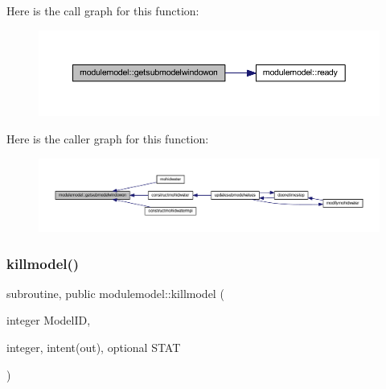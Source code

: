 Here is the call graph for this function\+:\nopagebreak
\begin{figure}[H]
\begin{center}
\leavevmode
\includegraphics[width=350pt]{namespacemodulemodel_a2bb34f8b006f66681bc7e7276eb4579e_cgraph}
\end{center}
\end{figure}
Here is the caller graph for this function\+:\nopagebreak
\begin{figure}[H]
\begin{center}
\leavevmode
\includegraphics[width=350pt]{namespacemodulemodel_a2bb34f8b006f66681bc7e7276eb4579e_icgraph}
\end{center}
\end{figure}
\mbox{\label{namespacemodulemodel_a23647852257627fb606f6868bc295162}} 
\subsubsection{\texorpdfstring{killmodel()}{killmodel()}}
{\footnotesize\ttfamily subroutine, public modulemodel\+::killmodel (\begin{DoxyParamCaption}\item[{integer}]{Model\+ID,  }\item[{integer, intent(out), optional}]{S\+T\+AT }\end{DoxyParamCaption})}

